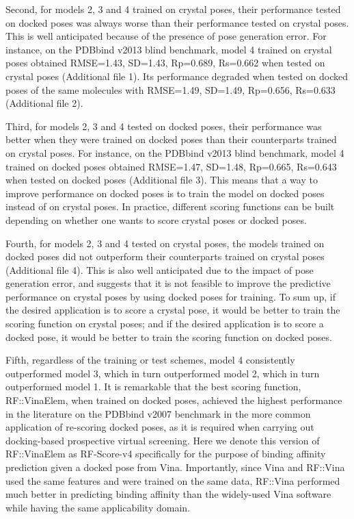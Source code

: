 \documentclass[twocolumn]{bmcart}
\begin{document}
Second, for models 2, 3 and 4 trained on crystal poses, their performance tested on docked poses was always worse than their performance tested on crystal poses. This is well anticipated because of the presence of pose generation error. For instance, on the PDBbind v2013 blind benchmark, model 4 trained on crystal poses obtained RMSE=1.43, SD=1.43, Rp=0.689, Rs=0.662 when tested on crystal poses (Additional file 1). Its performance degraded when tested on docked poses of the same molecules with RMSE=1.49, SD=1.49, Rp=0.656, Rs=0.633 (Additional file 2).

Third, for models 2, 3 and 4 tested on docked poses, their performance was better when they were trained on docked poses than their counterparts trained on crystal poses. For instance, on the PDBbind v2013 blind benchmark, model 4 trained on docked poses obtained RMSE=1.47, SD=1.48, Rp=0.665, Rs=0.643 when tested on docked poses (Additional file 3). This means that a way to improve performance on docked poses is to train the model on docked poses instead of on crystal poses. In practice, different scoring functions can be built depending on whether one wants to score crystal poses or docked poses.

Fourth, for models 2, 3 and 4 tested on crystal poses, the models trained on docked poses did not outperform their counterparts trained on crystal poses (Additional file 4). This is also well anticipated due to the impact of pose generation error, and suggests that it is not feasible to improve the predictive performance on crystal poses by using docked poses for training. To sum up, if the desired application is to score a crystal pose, it would be better to train the scoring function on crystal poses; and if the desired application is to score a docked pose, it would be better to train the scoring function on docked poses.

Fifth, regardless of the training or test schemes, model 4 consistently outperformed model 3, which in turn outperformed model 2, which in turn outperformed model 1. It is remarkable that the best scoring function, RF::VinaElem, when trained on docked poses, achieved the highest performance in the literature on the PDBbind v2007 benchmark in the more common application of re-scoring docked poses, as it is required when carrying out docking-based prospective virtual screening. Here we denote this version of RF::VinaElem as RF-Score-v4 specifically for the purpose of binding affinity prediction given a docked pose from Vina. Importantly, since Vina and RF::Vina used the same features and were trained on the same data, RF::Vina performed much better in predicting binding affinity than the widely-used Vina software while having the same applicability domain.
\end{document}
